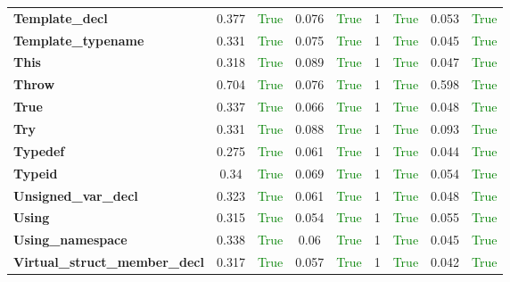 \documentclass{article}
\begin{document}
\begin{xltabular}{\textwidth}{lcccccccc}
\textbf{{\fontsize{10}{12}\selectfont Template\_decl}}& 0.377&\textcolor{green}{True}& 0.076&\textcolor{green}{True}& 1&\textcolor{green}{True}& 0.053&\textcolor{green}{True} \\[0.5ex]
\textbf{{\fontsize{10}{12}\selectfont Template\_typename}}& 0.331&\textcolor{green}{True}& 0.075&\textcolor{green}{True}& 1&\textcolor{green}{True}& 0.045&\textcolor{green}{True} \\[0.5ex]
\textbf{{\fontsize{10}{12}\selectfont This}}& 0.318&\textcolor{green}{True}& 0.089&\textcolor{green}{True}& 1&\textcolor{green}{True}& 0.047&\textcolor{green}{True} \\[0.5ex]
\textbf{{\fontsize{10}{12}\selectfont Throw}}& 0.704&\textcolor{green}{True}& 0.076&\textcolor{green}{True}& 1&\textcolor{green}{True}& 0.598&\textcolor{green}{True} \\[0.5ex]
\textbf{{\fontsize{10}{12}\selectfont True}}& 0.337&\textcolor{green}{True}& 0.066&\textcolor{green}{True}& 1&\textcolor{green}{True}& 0.048&\textcolor{green}{True} \\[0.5ex]
\textbf{{\fontsize{10}{12}\selectfont Try}}& 0.331&\textcolor{green}{True}& 0.088&\textcolor{green}{True}& 1&\textcolor{green}{True}& 0.093&\textcolor{green}{True} \\[0.5ex]
\textbf{{\fontsize{10}{12}\selectfont Typedef}}& 0.275&\textcolor{green}{True}& 0.061&\textcolor{green}{True}& 1&\textcolor{green}{True}& 0.044&\textcolor{green}{True} \\[0.5ex]
\textbf{{\fontsize{10}{12}\selectfont Typeid}}& 0.34&\textcolor{green}{True}& 0.069&\textcolor{green}{True}& 1&\textcolor{green}{True}& 0.054&\textcolor{green}{True} \\[0.5ex]
\textbf{{\fontsize{10}{12}\selectfont Unsigned\_var\_decl}}& 0.323&\textcolor{green}{True}& 0.061&\textcolor{green}{True}& 1&\textcolor{green}{True}& 0.048&\textcolor{green}{True} \\[0.5ex]
\textbf{{\fontsize{10}{12}\selectfont Using}}& 0.315&\textcolor{green}{True}& 0.054&\textcolor{green}{True}& 1&\textcolor{green}{True}& 0.055&\textcolor{green}{True} \\[0.5ex]
\textbf{{\fontsize{10}{12}\selectfont Using\_namespace}}& 0.338&\textcolor{green}{True}& 0.06&\textcolor{green}{True}& 1&\textcolor{green}{True}& 0.045&\textcolor{green}{True} \\[0.5ex]
\textbf{{\fontsize{10}{12}\selectfont Virtual\_struct\_member\_decl}}& 0.317&\textcolor{green}{True}& 0.057&\textcolor{green}{True}& 1&\textcolor{green}{True}& 0.042&\textcolor{green}{True} \\[0.5ex]

\end{xltabular}
\end{document}
